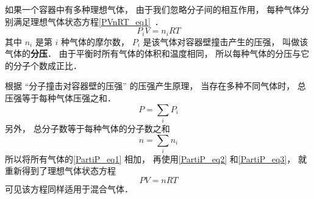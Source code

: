 

如果一个容器中有多种理想气体， 由于我们忽略分子间的相互作用， 每种气体分别满足理想气体状态方程\autoref{PVnRT_eq1}~．
\begin{equation}\label{PartiP_eq1}
P_i V = n_i R T
\end{equation}
其中 $n_i$ 是第 $i$ 种气体的摩尔数， $P_i$ 是该气体对容器壁撞击产生的压强， 叫做该气体的\textbf{分压}． 由于平衡时所有气体的体积和温度相同， 所以每种气体的分压与它的分子个数成正比．

根据 “分子撞击对容器壁的压强” 的压强产生原理， 当存在多种不同气体时， 总压强等于每种气体压强之和．
\begin{equation}\label{PartiP_eq2}
P = \sum_i P_i
\end{equation}
另外， 总分子数等于每种气体的分子数之和
\begin{equation}\label{PartiP_eq3}
n = \sum_i n_i
\end{equation}
所以将所有气体的\autoref{PartiP_eq1} 相加， 再使用\autoref{PartiP_eq2} 和\autoref{PartiP_eq3}， 就重新得到了理想气体状态方程
\begin{equation}
P V = n RT
\end{equation}
可见该方程同样适用于混合气体．

